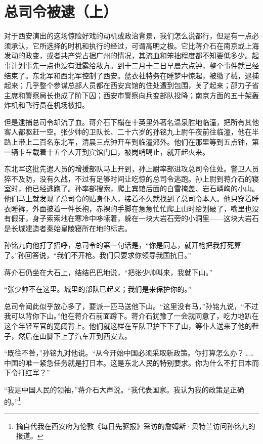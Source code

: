 \documentclass[10pt]{book}
\begin{document}
\section{总司令被逮（上）}

对于西安演出的这场惊险好戏的动机或政治背景，我们怎么说都行，但是有一点必须承认，它所选择的时机和执行的经过，可谓高明之极。它比蒋介石在南京或上海发动的政变，或者共产党占据广州的情况，其流血和笨拙程度都不知要低多少。起事计划事先一点也没有泄露给敌方。到十二月十二日早晨六点钟，整个事件就已经结束了。东北军和西北军控制了西安。蓝衣社特务在睡梦中惊起，被缴了械，逮捕起来；几乎整个参谋总部人员都在西安宾馆的住处遭到包围，关了起来；邵力子省主席和警察局长也成了阶下囚；西安市警察向兵变部队投降；南京方面的五十架轰炸机和飞行员在机场被扣。

但是逮捕总司令却流了血。蒋介石下榻在十英里外著名温泉胜地临潼，把所有其他客人都驱赶一空。张少帅的卫队长、二十六岁的孙铭九上尉午夜前往临潼，他在半路上带上二百名东北军，清晨三点钟开车到临潼郊外。他们在那里等到五点钟，第一辆卡车载着十五个人开到宾馆门口，被岗哨喝止，就开起火来。

东北军这批先遣人员的增援部队马上开到，孙上尉率部进攻总司令住处。警卫人员猝不及防，没有久战，不过有足够时间让吃惊的总司令逃跑。孙上尉到蒋介石的寝室时，他已经逃跑了。孙率部搜索，爬上宾馆后面的白雪掩盖、岩石嶙峋的小山。他们马上就发现了总司令的贴身仆人，接着不久就找到了总司令本人。他只穿着睡衣睡裤，外面披着一件长袍，赤裸的手脚在急急忙忙爬上山时给划破了，嘴里也没有假牙，身子索索地在寒冷中哆嗦着，躲在一块大岩石旁的小洞里——这块大岩石是长城建造者秦始皇陵寝所在地的标志。

孙铭九向他打了招呼，总司令的第一句话是，“你是同志，就开枪把我打死算了。”孙回答说，“我们不开枪。我们只要求你领导我国抗日。”

蒋介石仍坐在大石上，结结巴巴地说，“把张少帅叫来，我就下山。”

“张少帅不在这里。城里的部队已起义；我们是来保护你的。”

总司令闻此似乎放心多了，要派一匹马送他下山。“这里没有马，”孙铭九说，“不过我可以背你下山。”他在蒋介石前面蹲下。蒋介石犹豫了一会就同意了，吃力地趴在这个年轻军官的宽阔背上。他们就这样在军队卫护下下了山，等仆人送来了他的鞋子，然后在山脚下上了汽车开到西安去。

“既往不咎，”孙铭九对他说。“从今开始中国必须采取新政策。你打算怎么办？……中国的唯一紧急任务就是打日本。这是东北人民的特别要求。你为什么不打日本而下令打红军？”

“我是中国人民的领袖，”蒋介石大声说。“我代表国家。我认为我的政策是正确的。”\footnote{摘自代我在西安府为伦敦《每日先驱报》采访的詹姆斯·贝特兰访问孙铭九的报道。}
\end{document}
